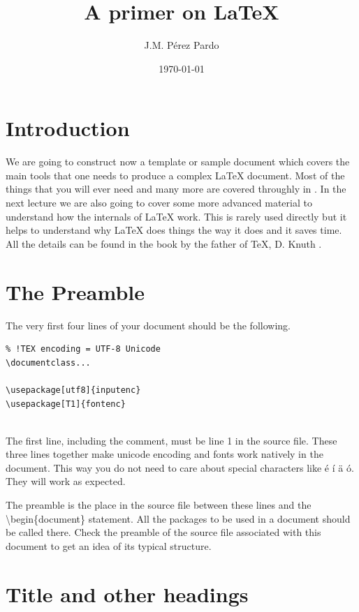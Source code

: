 \documentclass[a4paper]{article}
\author{J.M. Pérez Pardo} %
\title{A primer on \LaTeX} %
\date{\today} %
\newcommand{\bs}[1]{{\color{blue}\textbackslash{}#1}}
\begin{document}
\maketitle

\tableofcontents

\section{Introduction}

We are going to construct now a template or sample document which covers the main tools that one needs to produce a complex \LaTeX{} document. Most of the things that you will ever need and many more are covered throughly in \cite{MittelbachGoossens2004}. In the next lecture we are also going to cover some more advanced material to understand how the internals of \LaTeX{} work. This is rarely used directly but it helps to understand why \LaTeX{} does things the way it does and it saves time. All the details can be found in the book by the father of \TeX, D. Knuth \cite{Knuth1990}.

\section{The Preamble}

The very first four lines of your document should be the following. 

\begin{verbatim}
% !TEX encoding = UTF-8 Unicode
\documentclass...

\usepackage[utf8]{inputenc}
\usepackage[T1]{fontenc}


\end{verbatim}


The first line, including the comment, must be line 1 in the source file. These three lines together make unicode encoding and fonts work natively in the document. This way you do not need to care about special characters like é í ä ó. They will work as expected. 

The preamble is the place in the source file between these lines and the \bs{begin}\{document\} statement. All the packages to be used in a document should be called there. Check the preamble of the source file associated with this document to get an idea of its typical structure.

\section{Title and other headings}
\end{document}
